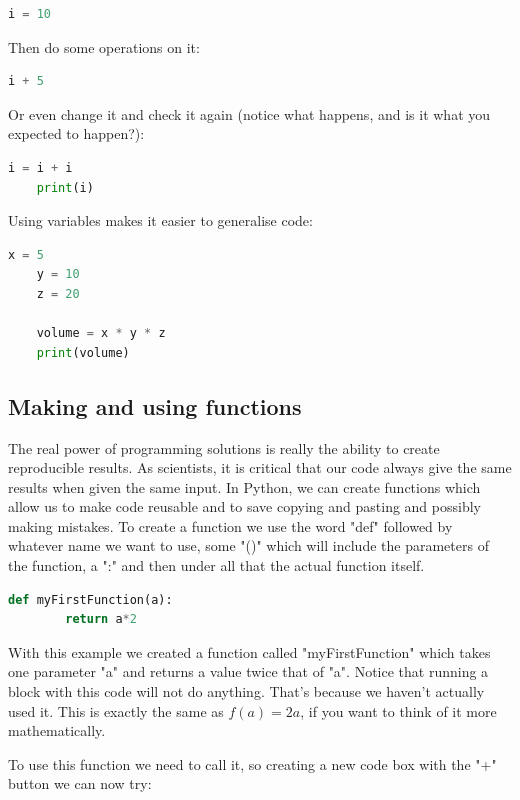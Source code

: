 \documentclass[12pt]{article}
\begin{document}
\begin{lstlisting}[language=Python]
    i = 10
\end{lstlisting}

Then do some operations on it: 


\begin{lstlisting}[language=Python]
    i + 5
\end{lstlisting}

Or even change it and check it again (notice what happens, and is it what you expected to happen?): 

\begin{lstlisting}[language=Python]
    i = i + i 
    print(i)
\end{lstlisting}

Using variables makes it easier to generalise code: 

\begin{lstlisting}[language=Python]
    x = 5
    y = 10
    z = 20

    volume = x * y * z
    print(volume)
\end{lstlisting}

\subsection{Making and using functions}

The real power of programming solutions is really the ability to create reproducible results. As scientists, it is critical that our code always give the same results when given the same input.  In Python, we can create functions which allow us to make code reusable and to save copying and pasting and possibly making mistakes. To create a function we use the word "def" followed by whatever name we want to use, some "()" which will include the parameters of the function, a ":" and then under all that the actual function itself.

\begin{lstlisting}[language=Python]
    def myFirstFunction(a):
        return a*2
\end{lstlisting}

With this example we created a function called "myFirstFunction" which takes one parameter "a" and returns a value twice that of "a". Notice that running a block with this code will not do anything. That's because we haven't actually used it.  This is exactly the same as $f(a) = 2a$, if you want to think of it more mathematically.

To use this function we need to call it, so creating a new code box with the "+" button we can now try: 
\end{document}
